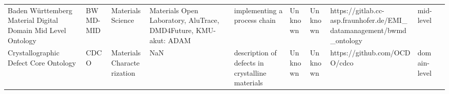 \begin{tabular}{llllllllll}
                     Baden Württemberg Material Digital Domain Mid Level Ontology &                BWMD-MID &                           Materials Science &                                                                                                                                                                                                                                                                                                      Materials Open Laboratory, AluTrace, DMD4Future, KMU-akut: ADAM &                                                                                                                                                                                                                                                                                                                                                                           implementing a process chain &                                                                                                            Unknown &                                      Unknown &                               https://gitlab.cc-asp.fraunhofer.de/EMI_datamanagement/bwmd_ontology &         mid-level \\
                                            Crystallographic Defect Core Ontology &                    CDCO &                  Materials Characterization &                                                                                                                                                                                                                                                                                                                                                                  NaN &                                                                                                                                                                                                                                                                                                                                                        description of defects in crystalline materials &                                                                                                            Unknown &                                      Unknown &                                                                       https://github.com/OCDO/cdco &      domain-level \\

\end{tabular}
